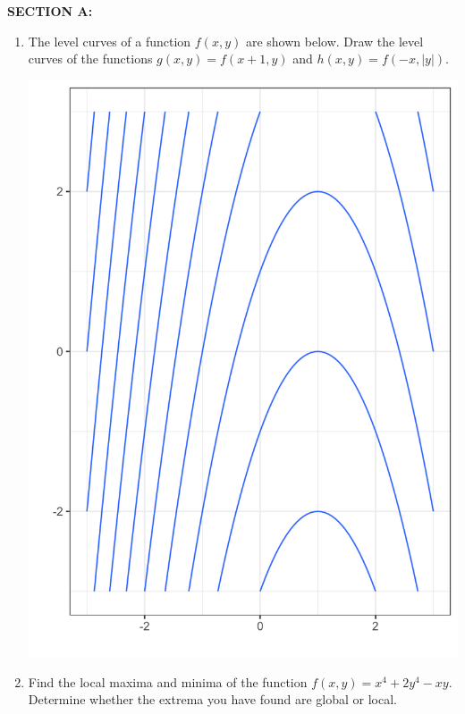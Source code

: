 \documentclass[12pt]{article} %
\theoremstyle{definition} %
\begin{document}
\textbf{SECTION A:}
\begin{enumerate}

\item The level curves of a function $f(x,y)$ are shown below. Draw the level curves of the functions $g(x,y)=f(x+1,y)$ and $h(x,y)=f(-x,|y|)$.



\begin{minipage}{0.6\textwidth}
 \begin{center}
  \includegraphics[scale = 0.3]{figure/line_curves.png}
%  
  \end{center}
\end{minipage}
  


\item Find the local maxima and minima of the function $f(x,y)=x^4+2y^4-xy$. Determine whether the extrema you have found are global or local.


\end{enumerate}
\end{document}
